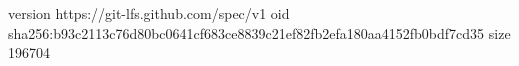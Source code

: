 version https://git-lfs.github.com/spec/v1
oid sha256:b93c2113c76d80bc0641cf683ce8839c21ef82fb2efa180aa4152fb0bdf7cd35
size 196704
